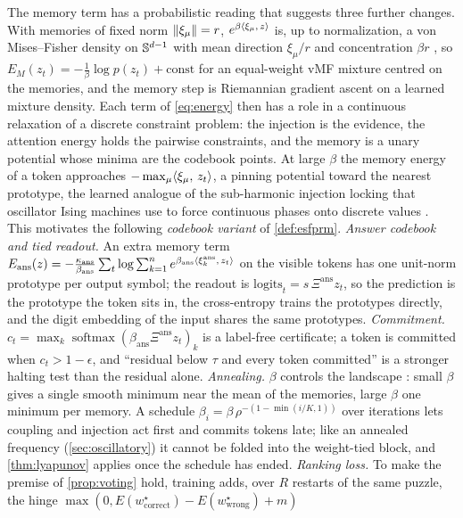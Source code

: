 The memory term has a probabilistic reading that suggests three further changes. With memories of
fixed norm $\lVert \xi_\mu\rVert=r$, $e^{\beta\langle \xi_\mu,\, z\rangle}$ is, up to normalization, a von
Mises--Fisher density on $\mathbb{S}^{d-1}$ with mean direction $\xi_\mu/r$ and concentration $\beta r$
\citep{mardia2000}, so $E_M(z_t)=-\tfrac1\beta\log p(z_t)+\mathrm{const}$ for an equal-weight
vMF mixture centred on the memories, and the memory step is Riemannian gradient ascent on a learned
mixture density. Each term of \eqref{eq:energy} then has a role in a continuous relaxation of a
discrete constraint problem: the injection is the evidence, the attention energy holds the pairwise
constraints, and the memory is a unary potential whose minima are the codebook points. At large
$\beta$ the memory energy of a token approaches $-\max_\mu\langle \xi_\mu,\, z_t\rangle$, a pinning potential
toward the nearest prototype, the learned analogue of the sub-harmonic injection locking that
oscillator Ising machines use to force continuous phases onto discrete values \citep{wang2019oim}.
This motivates the following \emph{codebook variant} of \cref{def:esfprm}.
\emph{Answer codebook and tied readout.} An extra memory term
$E_{\mathrm{ans}}(z)=-\tfrac{\kappa_{\mathrm{ans}}}{\beta_{\mathrm{ans}}}\sum_t\log\sum_{k=1}^{n}e^{\beta_{\mathrm{ans}}\langle \xi^{\mathrm{ans}}_k,\, z_t\rangle}$
on the visible tokens has one unit-norm prototype per output symbol; the readout is
$\mathrm{logits}_t=s\,\Xi^{\mathrm{ans}}z_t$, so the prediction is the prototype the token sits in,
the cross-entropy trains the prototypes directly, and the digit embedding of the input shares the
same prototypes. \emph{Commitment.} $c_t=\max_k\operatorname{softmax}(\beta_{\mathrm{ans}}\Xi^{\mathrm{ans}}z_t)_k$
is a label-free certificate; a token is committed when $c_t>1-\epsilon$, and ``residual below
$\tau$ and every token committed'' is a stronger halting test than the residual alone.
\emph{Annealing.} $\beta$ controls the landscape \citep{ramsauer2021hopfield}: small $\beta$ gives a
single smooth minimum near the mean of the memories, large $\beta$ one minimum per memory. A
schedule $\beta_i=\beta\,\rho^{-(1-\min(i/K,1))}$ over iterations lets coupling and injection act
first and commits tokens late; like an annealed frequency (\cref{sec:oscillatory}) it cannot be
folded into the weight-tied block, and \cref{thm:lyapunov} applies once the schedule has ended.
\emph{Ranking loss.} To make the premise of \cref{prop:voting} hold, training adds, over $R$
restarts of the same puzzle, the hinge $\max(0,E(w^\star_{\mathrm{correct}})-E(w^\star_{\mathrm{wrong}})+m)$
